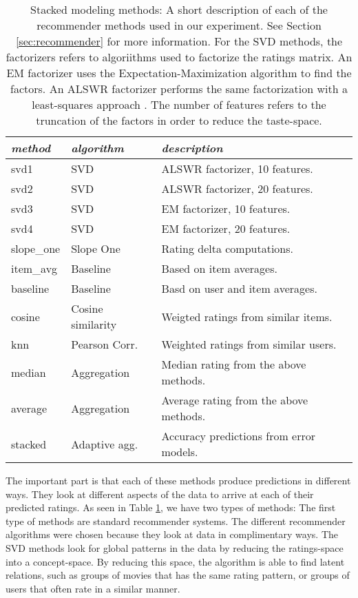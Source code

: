 \begin{table}[t]
  \begin{tabular*}{\textwidth}{ l l l }
    \toprule
    \emph{method} &  \emph{algorithm} & \emph{description} \\
    \midrule
    svd1          & SVD                   & ALSWR factorizer, 10 features. \\
    svd2          & SVD                   & ALSWR factorizer, 20 features. \\
    svd3          & SVD                   & EM factorizer, 10 features. \\
    svd4          & SVD                   & EM factorizer, 20 features. \\
    slope\_one    & Slope One             & Rating delta computations. \\
    item\_avg     & Baseline              & Based on item averages. \\ 
    baseline      & Baseline              & Basd on user and item averages.\\ 
    cosine   	    & Cosine similarity     & Weigted ratings from similar items.\\ 
    knn       	  & Pearson Corr.         & Weighted ratings from similar users.\\
    \midrule
    median    	  & Aggregation           & Median rating from the above methods. \\
    average    	  & Aggregation           & Average rating from the above methods. \\
    stacked       & Adaptive agg.         & Accuracy predictions from error models. \\
    \bottomrule
  \end{tabular*}
  \caption[Stacked Modeling Methods]{
    Stacked modeling methods: A short description of each of the recommender methods
    used in our experiment. See Section \ref{sec:recommender} for more information.
    For the SVD methods, the factorizers refers to algoriithms used to factorize the ratings matrix.
    An EM factorizer uses the Expectation-Maximization algorithm to find the factors.
    An ALSWR factorizer performs the same factorization with a least-squares approach \citep{Zhou2008}.
    The number of features refers to the truncation of the factors in order to reduce the taste-space.
  }
  \label{table:results:methods}
\end{table}

The important part is that each of these methods produce predictions in different ways.
They look at different aspects of the data to arrive at each of their predicted ratings.
As seen in Table \ref{table:results:methods}, we have two types of methods:
The first type of methods are standard recommender systems.
The different recommender algorithms were chosen because they 
look at data in complimentary ways. 
The SVD methods look for global patterns in the data 
by reducing the ratings-space into a concept-space.
By reducing this space, the algorithm is able to find
latent relations, such as groups of movies that has the same
rating pattern, or groups of users that often rate in a similar manner.

